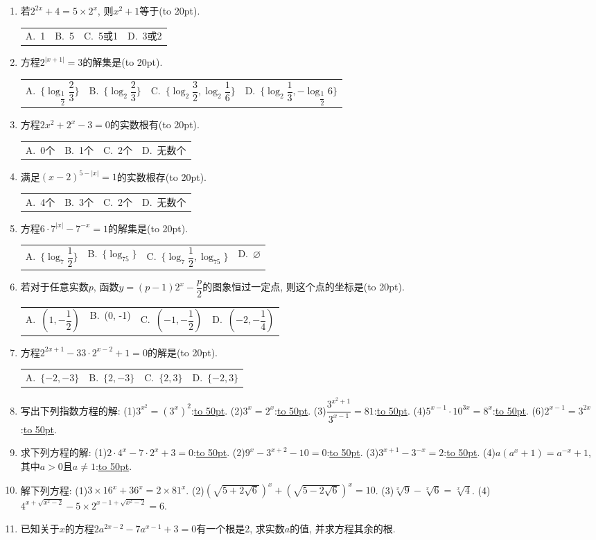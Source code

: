 \documentclass[10pt,a4paper]{article}
\newcommand{\blank}[1]{\underline{\hbox to #1pt{}}}
\newcommand{\bracket}[1]{(\hbox to #1pt{})}
\newcommand{\fourch}[4]{\par\begin{tabular}{p{.23\textwidth}p{.23\textwidth}p{.23\textwidth}p{.23\textwidth}}
A.~#1 &B.~#2& C.~#3& D.~#4
\end{tabular}}
\begin{document}
\begin{enumerate}[1.]
(图16)
注意  此类对数方程形式简单, 但综合性很强, 往往要归为对一元二次方程的根的讨论.解题时需注意以下三点.
(1)根据定义域, 列出条件方程, 一般总可省略其中的一个条件.
(2)如果转化为一次方程, 问题比较简单, 只要得到的$x$满足取值范围即可.
如果转化为二次方程, 那么:
(i)当$\triangle <0$时, 方程无解.
(ii)当$\triangle =0$时, 所得的$x$值, 若在取值范围内, 则有一解; 若不在取值范围内, 则无解.
(iii)当$\triangle >0$时, 所得的两个$x$值, 若均在取值范围内, 则有两解; 若恰有一个在取值范围内, 则有一解; 若均不在取值范围内, 则无解.
(3)对数方程常常归结为对一元二次方程的根的讨论, 而讨论的方法, 一般有运用求根公式、根与系数的关系及二次函数图象三种.
【训练题】
(一)指数方程
\item 若$2^{2x}+4=5\times 2^x$, 则$x^2+1$等于\bracket{20}.
\fourch{1}{5}{5或1}{3或2}
\item 方程$2^{|x+1|}=3$的解集是\bracket{20}.
\fourch{$\{\log _{\dfrac 12}\dfrac 23\}$}{$\{\log _2\dfrac 23\}$}{$\{\log _2\dfrac 32,\log _2\dfrac 16\}$}{$\{\log _2\dfrac 13,-\log _{\dfrac 12}6\}$}
\item 方程$2x^2+2^x-3=0$的实数根有\bracket{20}.
\fourch{0个}{1个}{2个}{无数个}
\item 满足$(x-2)^{5-|x|}=1$的实数根存\bracket{20}.
\fourch{4个}{3个}{2个}{无数个}
\item 方程$6\cdot 7^{|x|}-7^{-x}=1$的解集是\bracket{20}.
\fourch{$\{\log _7\dfrac 12\}$}{$\{\log _75\}$}{$\{\log _7\dfrac 12,\log _75\}$}{$\varnothing$}
\item 若对于任意实数$p$, 函数$y=(p-1)2^x-\dfrac p2$的图象恒过一定点, 则这个点的坐标是\bracket{20}.
\fourch{$(1,-\dfrac 12)$}{(0, -1)}{$(-1,-\dfrac 12)$}{$(-2,-\dfrac 14)$}
\item 方程$2^{2x+1}-33\cdot 2^{x-2}+1=0$的解是\bracket{20}.
\fourch{$\{-2,-3\}$}{$\{2,-3\}$}{$\{2,3\}$}{$\{-2,3\}$}
\item 写出下列指数方程的解:
(1)$3^{x^2}=(3^x)^2$:\blank{50}.
(2)$3^x=2^x$:\blank{50}.
(3)$\dfrac{3^{x^2+1}}{3^{x-1}}=81$:\blank{50}.
(4)$5^{x-1}\cdot 10^{3x}=8^x$:\blank{50}.
(6)$2^{x-1}=3^{2x}$:\blank{50}.
\item 求下列方程的解:
(1)$2\cdot 4^x-7\cdot 2^x+3=0$:\blank{50}.
(2)$9^x-3^{x+2}-10=0$:\blank{50}.
(3)$3^{x+1}-3^{-x}=2$:\blank{50}.
(4)$a(a^x+1)=a^{-x}+1$, 其中$a>0$且$a\ne 1$:\blank{50}.
\item 解下列方程:
(1)$3\times 16^x+36^x=2\times 81^x$.			(2)$(\sqrt {5+2\sqrt 6})^x+(\sqrt {5-2\sqrt 6})^x=10$.
(3)$\sqrt[x]9-\sqrt[x]6=\sqrt[x]4$.					(4)$4^{x+\sqrt {x^2-2}}-5\times 2^{x-1+\sqrt {x^2-2}}=6$.
\item 已知关于$x$的方程$2a^{2x-2}-7a^{x-1}+3=0$有一个根是2, 求实数$a$的值, 并求方程其余的根.

\end{enumerate}
\end{document}
